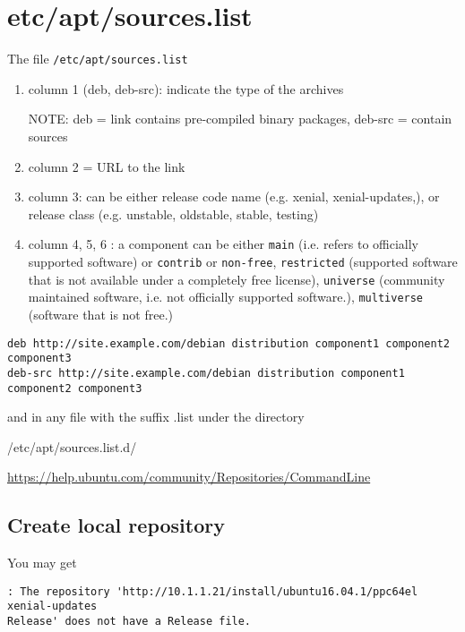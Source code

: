 \section{etc/apt/sources.list}
\label{sec:sources.list}

The file \verb!/etc/apt/sources.list! 
\begin{enumerate}
  \item column 1 (deb, deb-src): indicate the type of the archives
  
  NOTE: deb = link contains pre-compiled binary packages, deb-src = contain
  sources
  
  \item column 2 = URL to the link
  
  \item column 3: can be either release code name (e.g. xenial,
  xenial-updates,), or release class (e.g. unstable, oldstable, stable, testing)
  
  \item column 4, 5, 6 : a component can be either \verb!main! (i.e. refers to
  officially supported software) or \verb!contrib! or \verb!non-free!,
  \verb!restricted! (supported software that is not available under a completely
  free license), \verb!universe! (community maintained software, i.e. not
  officially supported software.), \verb!multiverse! (software that is not
  free.)
  

\end{enumerate}
\begin{verbatim}
deb http://site.example.com/debian distribution component1 component2 component3
deb-src http://site.example.com/debian distribution component1 component2 component3
\end{verbatim}

and in any file with the suffix .list under the directory

/etc/apt/sources.list.d/

\url{https://help.ubuntu.com/community/Repositories/CommandLine}

\subsection{Create local repository}

You may get
\begin{verbatim}
: The repository 'http://10.1.1.21/install/ubuntu16.04.1/ppc64el xenial-updates
Release' does not have a Release file.
\end{verbatim}


